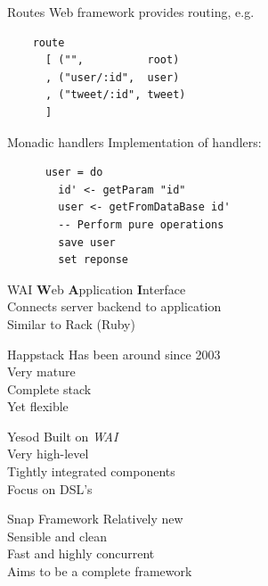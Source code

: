 \documentclass[20pt]{beamer}
\begin{document}
\begin{frame}[fragile]{Routes}
    Web framework provides routing, e.g.

    \begin{lstlisting}
    route
      [ ("",          root)
      , ("user/:id",  user)
      , ("tweet/:id", tweet)
      ]
    \end{lstlisting}
\end{frame}

\begin{frame}[fragile]{Monadic handlers}
    Implementation of handlers:

    \begin{lstlisting}
      user = do
        id' <- getParam "id"
        user <- getFromDataBase id'
        -- Perform pure operations
        save user
        set reponse
    \end{lstlisting}
\end{frame}

\begin{frame}{WAI}
    \textbf{W}eb \textbf{A}pplication \textbf{I}nterface \\
    Connects server backend to application \\
    Similar to Rack (Ruby) \\
\end{frame}

\begin{frame}{Happstack}
    Has been around since 2003 \\
    Very mature \\
    Complete stack \\
    Yet flexible
\end{frame}

\begin{frame}{Yesod}
    Built on \emph{WAI} \\
    Very high-level \\
    Tightly integrated components \\
    Focus on DSL's \\
\end{frame}

\begin{frame}{Snap Framework}
    Relatively new \\
    Sensible and clean \\
    Fast and highly concurrent \\
    Aims to be a complete framework \\
\end{frame}
\end{document}
